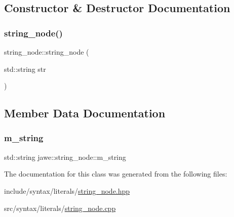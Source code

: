 \subsection{Constructor \& Destructor Documentation}
\mbox{\label{classjawe_1_1string__node_a96262bdce7a1297f891434e56290b069}} 
\subsubsection{\texorpdfstring{string\+\_\+node()}{string\_node()}}
{\footnotesize\ttfamily string\+\_\+node\+::string\+\_\+node (\begin{DoxyParamCaption}\item[{std\+::string}]{str }\end{DoxyParamCaption})}



\subsection{Member Data Documentation}
\mbox{\label{classjawe_1_1string__node_a97cbd4067950b166ab489ff22dc46358}} 
\subsubsection{\texorpdfstring{m\+\_\+string}{m\_string}}
{\footnotesize\ttfamily std\+::string jawe\+::string\+\_\+node\+::m\+\_\+string\hspace{0.3cm}{\ttfamily [private]}}



The documentation for this class was generated from the following files\+:\begin{DoxyCompactItemize}
\item 
include/syntax/literals/\hyperlink{string__node_8hpp}{string\+\_\+node.\+hpp}\item 
src/syntax/literals/\hyperlink{string__node_8cpp}{string\+\_\+node.\+cpp}\end{DoxyCompactItemize}
